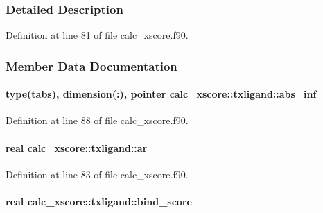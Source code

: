 \subsubsection{Detailed Description}


Definition at line 81 of file calc\-\_\-xscore.\-f90.



\subsubsection{Member Data Documentation}
\hypertarget{structcalc__xscore_1_1txligand_a4c0a13d77613aa1393aba63e8dbceae7}{
\paragraph[{abs\-\_\-inf}]{\setlength{\rightskip}{0pt plus 5cm}type({\bf tabs}), dimension(\-:), pointer calc\-\_\-xscore\-::txligand\-::abs\-\_\-inf}}\label{structcalc__xscore_1_1txligand_a4c0a13d77613aa1393aba63e8dbceae7}


Definition at line 88 of file calc\-\_\-xscore.\-f90.

\hypertarget{structcalc__xscore_1_1txligand_a570b41972cdcedcd2e731eaddeb130a9}{
\paragraph[{ar}]{\setlength{\rightskip}{0pt plus 5cm}real calc\-\_\-xscore\-::txligand\-::ar}}\label{structcalc__xscore_1_1txligand_a570b41972cdcedcd2e731eaddeb130a9}


Definition at line 83 of file calc\-\_\-xscore.\-f90.

\hypertarget{structcalc__xscore_1_1txligand_a5c054024a9b2ab41fc5dcfdaf48b9703}{
\paragraph[{bind\-\_\-score}]{\setlength{\rightskip}{0pt plus 5cm}real calc\-\_\-xscore\-::txligand\-::bind\-\_\-score}}\label{structcalc__xscore_1_1txligand_a5c054024a9b2ab41fc5dcfdaf48b9703}



